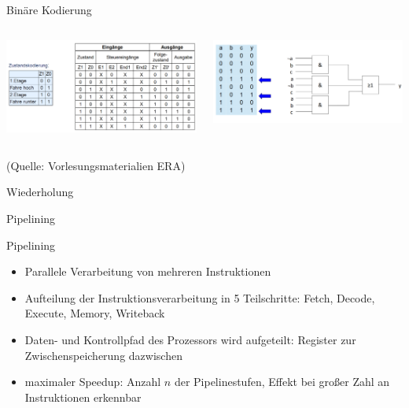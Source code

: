 \documentclass[
  german,            %
  aspectratio=169,    %
]{tumbeamer}
\begin{document}
\begin{frame}[c]{Binäre Kodierung}{}
  \begin{columns}[c]
		\begin{column}{0.5\textwidth}
      \begin{center}
        \includegraphics[width=\textwidth]{w09_bincode1_lv.png}
      \end{center}
    \end{column}
    \begin{column}{0.5\textwidth}
      \begin{center}
        \includegraphics[width=\textwidth]{w09_bincode2_lv.png}
      \end{center}
    \end{column}
  \end{columns}
  \vspace{0.5cm}
	\centering
	\tiny (Quelle: Vorlesungsmaterialien ERA)
\end{frame}

\begin{frame}[c]{Wiederholung}{}
	\begin{center}
	  \LARGE Pipelining
	\end{center}
\end{frame}

\begin{frame}[fragile, c]{Pipelining}{}
	\begin{itemize}
		\item Parallele Verarbeitung von mehreren Instruktionen
		\item Aufteilung der Instruktionsverarbeitung in 5 Teilschritte: Fetch, Decode, Execute, Memory, Writeback
		\item Daten- und Kontrollpfad des Prozessors wird aufgeteilt: Register zur Zwischenspeicherung dazwischen
		\item maximaler Speedup: Anzahl $n$ der Pipelinestufen, Effekt bei großer Zahl an Instruktionen erkennbar
	\end{itemize}
\end{frame}
\end{document}
